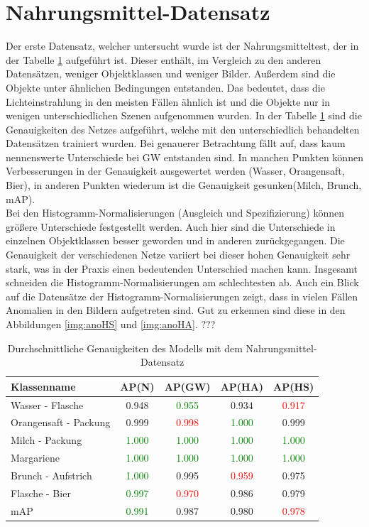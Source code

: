   \section{Nahrungsmittel-Datensatz}
Der erste Datensatz, welcher untersucht wurde ist der Nahrungsmitteltest, der in der Tabelle \ref{tab:nahrungsmitteltest} aufgeführt ist. Dieser enthält, im Vergleich zu den anderen Datensätzen, weniger Objektklassen und weniger Bilder. Außerdem sind die Objekte unter ähnlichen Bedingungen entstanden. Das bedeutet, dass die Lichteinstrahlung in den meisten Fällen ähnlich ist und die Objekte nur in wenigen unterschiedlichen Szenen aufgenommen wurden. In der Tabelle \ref{tab:nahrungsmitteltest} sind die Genauigkeiten des Netzes aufgeführt, welche mit den unterschiedlich behandelten Datensätzen trainiert wurden. Bei genauerer Betrachtung fällt auf, dass kaum nennenswerte Unterschiede bei GW entstanden sind. In manchen Punkten können Verbesserungen in der Genauigkeit ausgewertet werden (Wasser, Orangensaft, Bier), in anderen Punkten wiederum ist die Genauigkeit gesunken(Milch, Brunch, mAP).\\
Bei den Histogramm-Normalisierungen (Ausgleich und Spezifizierung) können größere Unterschiede festgestellt werden. Auch hier sind die Unterschiede in einzelnen Objektklassen besser geworden und in anderen zurückgegangen. Die Genauigkeit der verschiedenen Netze variiert bei dieser hohen Genauigkeit sehr stark, was in der Praxis einen bedeutenden Unterschied machen kann. Insgesamt schneiden die Histogramm-Normalisierungen am schlechtesten ab. Auch ein Blick auf die Datensätze der Histogramm-Normalisierungen zeigt, dass in vielen Fällen Anomalien in den Bildern aufgetreten sind. Gut zu erkennen sind diese in den Abbildungen \ref{img:anoHS} und \ref{img:anoHA}. ???
\begin{table}
[h]
\caption{Durchschnittliche Genauigkeiten des Modells mit dem Nahrungsmittel-Datensatz}
\centering
\begin{tabular}{|l|c|c|c|c|}
\hline
Klassenname & AP(N) & AP(GW) & AP(HA) & AP(HS)\\
\hline
Wasser - Flasche & 0.948 & \textcolor{green}{0.955} & 0.934 & \textcolor{red}{0.917}\\
Orangensaft - Packung & 0.999 & \textcolor{red}{0.998} & \textcolor{green}{1.000} & 0.999\\
Milch - Packung & \textcolor{green}{1.000} & \textcolor{green}{1.000} & \textcolor{green}{1.000} & \textcolor{green}{1.000}\\
Margariene & \textcolor{green}{1.000} & \textcolor{green}{1.000} & \textcolor{green}{1.000} & \textcolor{green}{1.000}\\
Brunch - Aufstrich & \textcolor{green}{1.000} & 0.995 & \textcolor{red}{0.959} & 0.975\\
Flasche - Bier & \textcolor{green}{0.997} & \textcolor{red}{0.970} & 0.986 & 0.979\\
\hline
mAP & \textcolor{green}{0.991} & 0.987 & 0.980 & \textcolor{red}{0.978}\\
\hline
\end{tabular}
\label{tab:nahrungsmitteltest}
\end{table}
